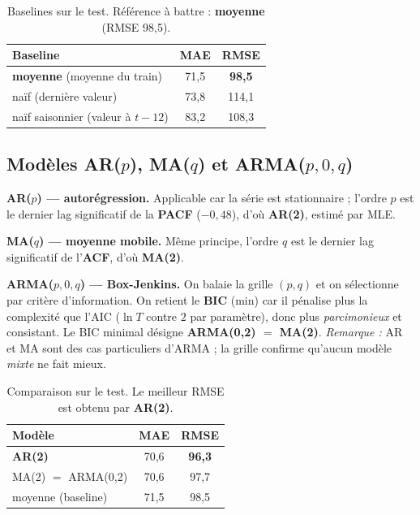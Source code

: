 \documentclass[11pt,a4paper]{article}
\newcommand{\alert}[1]{\textcolor{red!70!black}{\textbf{#1}}}
\begin{document}
\begin{table}[H]
      \centering
      \begin{tabular}{lcc}
            \toprule
            Baseline                           & MAE  & RMSE         \\ \midrule
            \alert{moyenne} (moyenne du train) & 71,5 & \alert{98,5} \\
            naïf (dernière valeur)             & 73,8 & 114,1        \\
            naïf saisonnier (valeur à $t-12$)  & 83,2 & 108,3        \\ \bottomrule
      \end{tabular}
      \caption{Baselines sur le test. Référence à battre : \textbf{moyenne} (RMSE 98,5).}
\end{table}

\subsection{Modèles AR($p$), MA($q$) et ARMA($p,0,q$)}

\textbf{AR($p$) --- autorégression.} Applicable car la série est stationnaire ; l'ordre $p$
est le dernier lag significatif de la \textbf{PACF} ($-0{,}48$), d'où \textbf{AR(2)}, estimé
par MLE.

\textbf{MA($q$) --- moyenne mobile.} Même principe, l'ordre $q$ est le dernier lag
significatif de l'\textbf{ACF}, d'où \textbf{MA(2)}.

\textbf{ARMA($p,0,q$) --- Box-Jenkins.} On balaie la grille $(p,q)$ et on sélectionne par
critère d'information. On retient le \textbf{BIC} (min) car il pénalise plus la complexité
que l'AIC ($\ln T$ contre $2$ par paramètre), donc plus \emph{parcimonieux} et consistant.
Le BIC minimal désigne \textbf{ARMA(0,2) $=$ MA(2)}. \emph{Remarque :} AR et MA sont des cas
particuliers d'ARMA ; la grille confirme qu'aucun modèle \emph{mixte} ne fait mieux.

\begin{table}[H]
      \centering
      \begin{tabular}{lcc}
            \toprule
            Modèle              & MAE  & RMSE         \\ \midrule
            \alert{AR(2)}       & 70,6 & \alert{96,3} \\
            MA(2) $=$ ARMA(0,2) & 70,6 & 97,7         \\
            moyenne (baseline)  & 71,5 & 98,5         \\ \bottomrule
      \end{tabular}
      \caption{Comparaison sur le test. Le meilleur RMSE est obtenu par \textbf{AR(2)}.}
\end{table}
\end{document}
